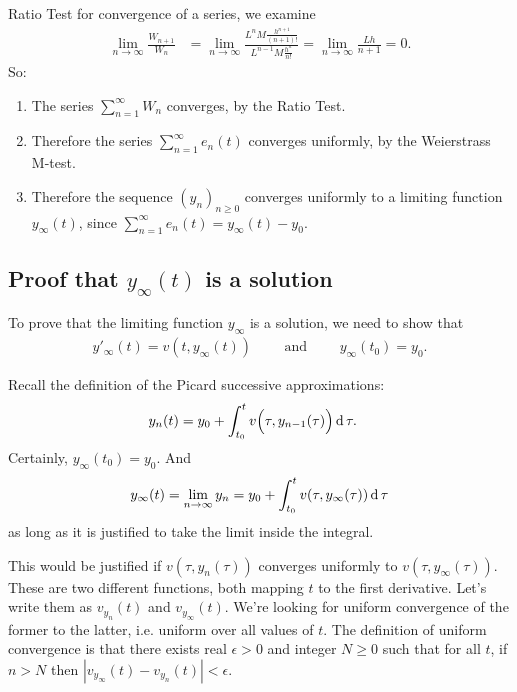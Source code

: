 Ratio Test for convergence of a series, we examine
\begin{align*}
  \lim_{n\to \infty} \frac{W_{n+1}}{W_n}
  &= \lim_{n\to\infty} \frac{L^nM\frac{h^{n+1}}{(n+1)!}}
                          {L^{n-1}M\frac{h^n}{n!}}
   = \lim_{n\to\infty} \frac{Lh}{n+1}
    = 0.
\end{align*}
So:
\begin{enumerate}
\item The series $\sum_{n=1}^\infty W_n$ converges, by the Ratio Test.
\item Therefore the series $\sum_{n=1}^\infty e_n(t)$ converges uniformly, by
  the Weierstrass M-test.
\item Therefore the sequence $(y_n)_{n\geq 0}$ converges uniformly to a
  limiting function $y_\infty(t)$, since
  $\sum_{n=1}^\infty e_n(t) = y_\infty(t) - y_0$.
\end{enumerate}



\subsection{Proof that $y_\infty(t)$ is a solution}

To prove that the limiting function $y_\infty$ is a solution, we need to show
that
\begin{align*}
  y'_\infty(t) = v(t, y_\infty(t)) \text{~~~~~~~and~~~~~~~} y_\infty(t_0) = y_0.
\end{align*}

Recall the definition of the Picard successive approximations:
\begin{align*}
    y_n(t) &= y_0 + \int_{t_0}^t v\Big(\tau, y_{n-1}(\tau)\Big) \operatorname{\text{d}}\tau.
\end{align*}
Certainly, $y_\infty(t_0) = y_0$. And
\begin{align*}
  y_\infty(t) = \lim_{n\to \infty} y_n = y_0 + \int_{t_0}^t v(\tau, y_\infty(\tau)) \operatorname{\text{d}}\tau
\end{align*}
as long as it is justified to take the limit inside the integral.

This would be justified if $v(\tau, y_n(\tau))$ converges uniformly to
$v(\tau, y_\infty(\tau))$. These are two different functions, both mapping $t$
to the first derivative. Let's write them as $v_{y_n}(t)$ and
$v_{y_\infty}(t)$. We're looking for uniform convergence of the former to the
latter, i.e. uniform over all values of $t$. The definition of uniform
convergence is that there exists real $\epsilon > 0$ and integer $N \geq 0$
such that for all $t$, if $n > N$ then
$|v_{y_\infty}(t) - v_{y_n}(t)| < \epsilon$.

